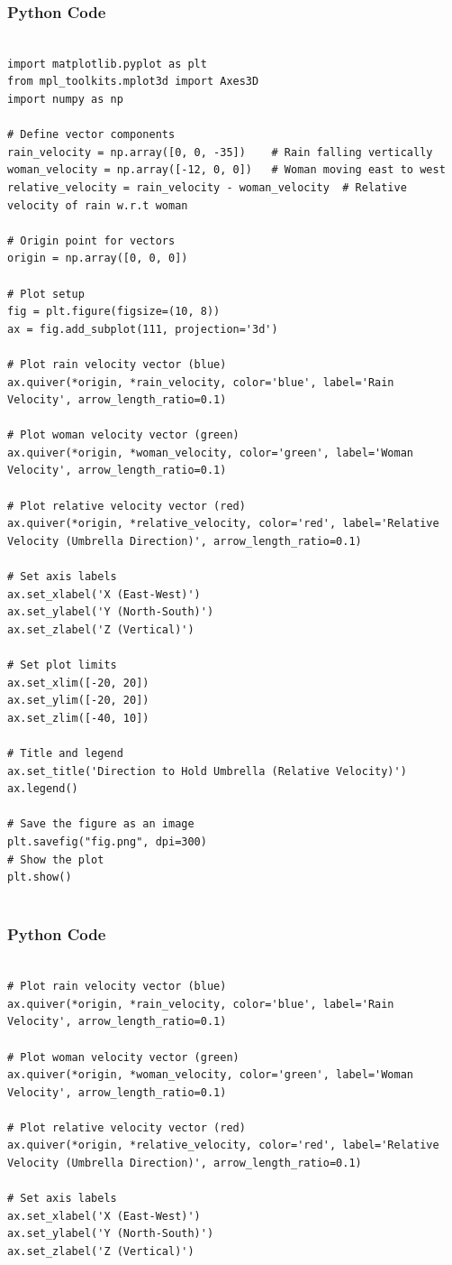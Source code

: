 \documentclass{beamer}
\begin{document}
\begin{frame}[fragile]
    \frametitle{Python Code}
    \begin{lstlisting}

import matplotlib.pyplot as plt
from mpl_toolkits.mplot3d import Axes3D
import numpy as np

# Define vector components
rain_velocity = np.array([0, 0, -35])    # Rain falling vertically
woman_velocity = np.array([-12, 0, 0])   # Woman moving east to west
relative_velocity = rain_velocity - woman_velocity  # Relative velocity of rain w.r.t woman

# Origin point for vectors
origin = np.array([0, 0, 0])

# Plot setup
fig = plt.figure(figsize=(10, 8))
ax = fig.add_subplot(111, projection='3d')

# Plot rain velocity vector (blue)
ax.quiver(*origin, *rain_velocity, color='blue', label='Rain Velocity', arrow_length_ratio=0.1)

# Plot woman velocity vector (green)
ax.quiver(*origin, *woman_velocity, color='green', label='Woman Velocity', arrow_length_ratio=0.1)

# Plot relative velocity vector (red)
ax.quiver(*origin, *relative_velocity, color='red', label='Relative Velocity (Umbrella Direction)', arrow_length_ratio=0.1)

# Set axis labels
ax.set_xlabel('X (East-West)')
ax.set_ylabel('Y (North-South)')
ax.set_zlabel('Z (Vertical)')

# Set plot limits
ax.set_xlim([-20, 20])
ax.set_ylim([-20, 20])
ax.set_zlim([-40, 10])

# Title and legend
ax.set_title('Direction to Hold Umbrella (Relative Velocity)')
ax.legend()

# Save the figure as an image
plt.savefig("fig.png", dpi=300)
# Show the plot
plt.show()


    \end{lstlisting}
\end{frame}







\begin{frame}[fragile]
    \frametitle{Python Code}
    \begin{lstlisting}

# Plot rain velocity vector (blue)
ax.quiver(*origin, *rain_velocity, color='blue', label='Rain Velocity', arrow_length_ratio=0.1)

# Plot woman velocity vector (green)
ax.quiver(*origin, *woman_velocity, color='green', label='Woman Velocity', arrow_length_ratio=0.1)

# Plot relative velocity vector (red)
ax.quiver(*origin, *relative_velocity, color='red', label='Relative Velocity (Umbrella Direction)', arrow_length_ratio=0.1)

# Set axis labels
ax.set_xlabel('X (East-West)')
ax.set_ylabel('Y (North-South)')
ax.set_zlabel('Z (Vertical)')

    \end{lstlisting}
\end{frame}
\end{document}
